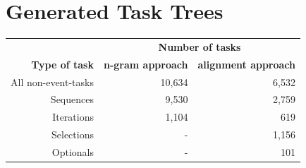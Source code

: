 \section{Generated Task Trees}
\begin{table}
	\centering
	\begin{tabular}{ r r r }
	   \toprule
	    & \multicolumn{2}{c}{\textbf{Number of tasks}} \\
		\cmidrule{2-3}
		\textbf{Type of task}& \textbf{n-gram approach} & \textbf{alignment approach} \\
	   \midrule
	   All non-event-tasks 	& 10,634 			& 6,532 \\
		\midrule
	   Sequences 				& 9,530 				& 2,759 \\
	   Iterations 				& 1,104 				& 619 \\
	   Selections 				& -\hspace{12pt}	& 1,156 \\
	   Optionals 				& -\hspace{12pt} 	& 101 \\
	   \bottomrule
\end{tabular}
\end{table}



